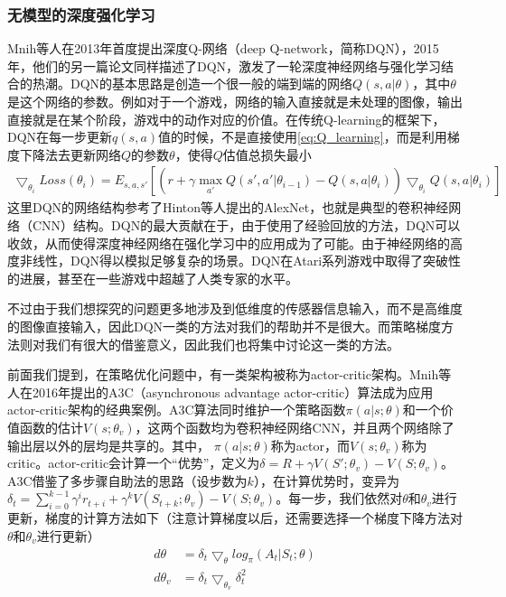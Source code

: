 \documentclass[degree=bachelor, tocarialchapter, pifootnote]{thuthesis}
\begin{document}
    \subsubsection{无模型的深度强化学习}
      Mnih等人在2013年首度提出深度Q-网络（deep Q-network，简称DQN）\cite{atari_2013}，2015年，他们的另一篇论文同样描述了DQN\cite{nature2015}，激发了一轮深度神经网络与强化学习结合的热潮\cite{deepRL_overview}。DQN的基本思路是创造一个很一般的端到端的网络$Q(s, a | \theta)$，其中$\theta$是这个网络的参数。例如对于一个游戏，网络的输入直接就是未处理的图像，输出直接就是在某个阶段，游戏中的动作对应的价值。在传统Q-learning的框架下，DQN在每一步更新$q(s, a)$值的时候，不是直接使用\eqref{eq:Q_learning}，而是利用梯度下降法去更新网络$Q$的参数$\theta$，使得$Q$估值总损失最小
      \begin{align*}
        \bigtriangledown_{\theta_i}Loss(\theta_i) = E_{s, a, s'}[(r+\gamma \max_{a'}Q(s', a'|\theta_{i-1}) - Q(s, a|\theta_i))\bigtriangledown_{\theta_i}Q(s, a|\theta_i)]
      \end{align*}
      这里DQN的网络结构参考了Hinton等人提出的AlexNet\cite{AlexNet}，也就是典型的卷积神经网络（CNN）结构。DQN的最大贡献在于，由于使用了经验回放的方法，DQN可以收敛，从而使得深度神经网络在强化学习中的应用成为了可能。由于神经网络的高度非线性，DQN得以模拟足够复杂的场景。DQN在Atari系列游戏中取得了突破性的进展，甚至在一些游戏中超越了人类专家的水平。\par
      不过由于我们想探究的问题更多地涉及到低维度的传感器信息输入，而不是高维度的图像直接输入，因此DQN一类的方法对我们的帮助并不是很大。而策略梯度方法则对我们有很大的借鉴意义，因此我们也将集中讨论这一类的方法。\par
      前面我们提到，在策略优化问题中，有一类架构被称为actor-critic架构。Mnih等人在2016年提出的A3C（asynchronous advantage actor-critic）算法\cite{A3C}成为应用actor-critic架构的经典案例。A3C算法同时维护一个策略函数$\pi(a|s; \theta)$和一个价值函数的估计$V(s; \theta_v )$，这两个函数均为卷积神经网络CNN，并且两个网络除了输出层以外的层均是共享的。其中， $\pi(a|s; \theta)$称为actor，而$V(s; \theta_v )$称为critic。actor-critic会计算一个``优势''，定义为$\delta = R + \gamma V(S'; \theta_v) - V(S; \theta_v)$\cite{Sutton_book}。A3C借鉴了多步骤自助法的思路（设步数为$k$），在计算优势时，变异为$\delta_t = \sum_{i = 0}^{k - 1}\gamma^i r_{t+i} + \gamma^k V(S_{t+k}; \theta_v) - V(S; \theta_v)$。每一步，我们依然对$\theta$和$\theta_v$进行更新，梯度的计算方法如下（注意计算梯度以后，还需要选择一个梯度下降方法对$\theta$和$\theta_v$进行更新）
      \begin{align}
      \label{eq:A3C_gradient1}
          d\theta &= \delta_t \bigtriangledown_{\theta} log_\pi(A_t|S_t; \theta)\\
      \label{eq:A3C_gradient2}
          d\theta_v &= \delta_t \bigtriangledown_{\theta_v} \delta_t^2
      \end{align}
\end{document}
